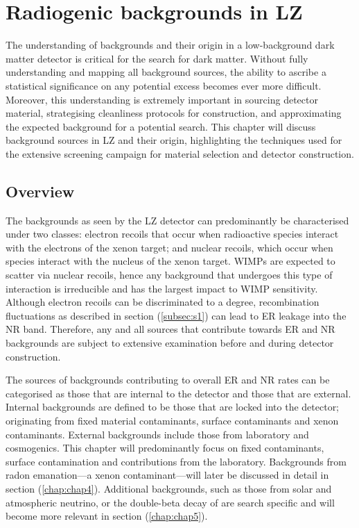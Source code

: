 \chapter{Radiogenic backgrounds in LZ}
\label{chap:chap3}

The understanding of backgrounds and their origin in a low-background dark matter detector is critical for the search for dark matter. Without fully understanding and mapping all background sources, the ability to ascribe a statistical significance on any potential excess becomes ever more difficult. Moreover, this understanding is extremely important in sourcing detector material, strategising cleanliness protocols for construction, and approximating the expected background for a potential search. This chapter will discuss background sources in LZ and their origin, highlighting the techniques used for the extensive screening campaign for material selection and detector construction.  

\section{Overview}

The backgrounds as seen by the LZ detector can predominantly be characterised under two classes: electron recoils that occur when radioactive species interact with the electrons of the xenon target; and nuclear recoils, which occur when species interact with the nucleus of the xenon target. WIMPs are expected to scatter via nuclear recoils, hence any background that undergoes this type of interaction is irreducible and has the largest impact to WIMP sensitivity. Although electron recoils can be discriminated to a degree, recombination fluctuations as described in section (\ref{subsec:s1}) can lead to ER leakage into the NR band. Therefore, any and all sources that contribute towards ER and NR backgrounds are subject to extensive examination before and during detector construction.

The sources of backgrounds contributing to overall ER and NR rates can be categorised as those that are internal to the detector and those that are external. Internal backgrounds are defined to be those that are locked into the detector; originating from fixed material contaminants, surface contaminants and xenon contaminants. External backgrounds include those from laboratory and cosmogenics. This chapter will predominantly focus on fixed contaminants, surface contamination and contributions from the laboratory. Backgrounds from radon emanation---a xenon contaminant---will later be discussed in detail in section (\ref{chap:chap4}). Additional backgrounds, such as those from solar and atmospheric neutrino, or the double-beta decay of \xeOTS{} are search specific and will become more relevant in section (\ref{chap:chap5}).

